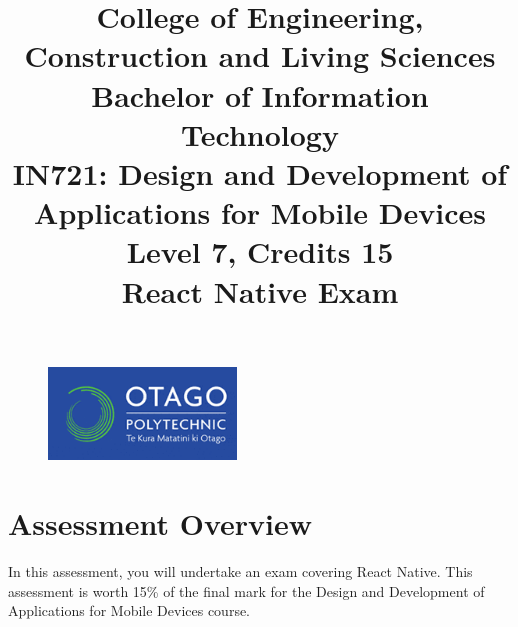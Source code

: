 \documentclass{article}
\author{}
\begin{document}
\begin{figure}
	\centering
	\includegraphics[width=50mm]{./img/logo.png} 
\end{figure}

\title{College of Engineering, Construction and Living Sciences\\Bachelor of Information Technology\\IN721: Design and Development of Applications for Mobile Devices\\Level 7, Credits 15\\\textbf{React Native Exam}}
\date{}
\maketitle

\section*{Assessment Overview}
In this assessment, you will undertake an exam covering React Native. This assessment is worth 15\% of the final mark for the Design and Development of Applications for Mobile Devices course. 
\end{document}
